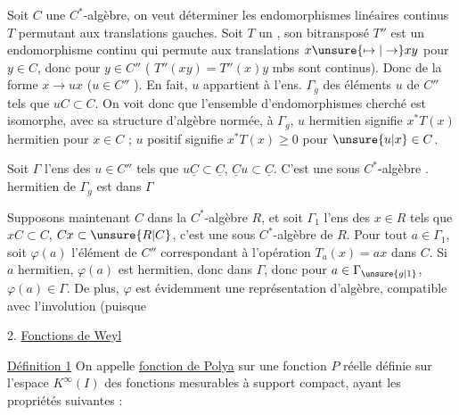 Soit $C$ une $C^*$-algèbre, on veut déterminer les  endomorphismes linéaires continus $T$ permutant aux translations gauches. Soit $T$ un , son bitransposé $T''$ est un endomorphisme  continu  qui permute aux translations $x\unsure{\mapsto|\to}xy$  pour $y\in C$, donc pour  $y\in C''$ ( $T''(xy)=T''(x)y$   mbs sont  continus). Donc de la forme $x\to ux$ ($u\in C''$ ). En fait, $u$ appartient à l'ens. $\Gamma_g$ des éléments $u$ de $C''$ tels que $uC\subset C$. On voit donc que l'ensemble d'endomorphismes cherché est isomorphe, avec sa structure d'algèbre normée, à $\Gamma_g$,  $u$ hermitien signifie $x^*T(x)$ hermitien pour  $x\in C$ ; $u$ positif signifie $x^*T(x)\geq 0$ pour  $\unsure{u|x}\in C$.

Soit  $\Gamma$ l'ens des $u\in C''$ tels que $u\underline{C}\subset\underline{C}$, $\underline{C}u\subset\underline{C}$. C'est une sous $C^*$-algèbre .    hermitien de $\Gamma_g$ est dans $\Gamma$

Supposons maintenant $C$  dans la $C^*$-algèbre $R$, et soit $\Gamma_1$ l'ens des $x\in R$ tels que $xC\subset C$, $Cx\subset \unsure{R|C}$, c'est une sous $C^*$-algèbre de $R$. Pour tout $a\in\Gamma_1$, soit $\varphi(a)$ l'élément de $C''$ correspondant à l'opération $T_a(x)=ax$ dans $C$. Si $a$ hermitien, $\varphi(a)$ est hermitien, donc dans $\Gamma$, donc pour  $a\in\Gamma_{\unsure{g|1}}$, $\varphi(a)\in\Gamma$. De plus, $\varphi$ est évidemment une représentation d'algèbre, compatible avec l'involution (puisque

2. \uline{Fonctions de Weyl}

 \uline{Définition 1}   On appelle \uline{fonction de Polya} sur  \inserted{$I=]0,\omega[$ $(0<\omega\leq+\infty)$} une fonction $P$ réelle définie sur l'espace $K^\infty(I)$ des fonctions mesurables à support compact, ayant les propriétés suivantes :

